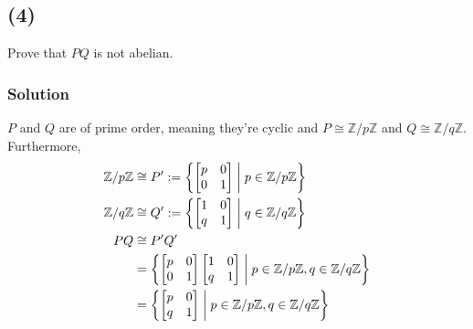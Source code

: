 \documentclass[fleqn]{article}
\begin{document}
        \subsection{(4)}
        Prove that $PQ$ is not abelian.
            
            \subsubsection{Solution}
            $P$ and $Q$ are of prime order, meaning they're cyclic and $P \cong \mathbb{Z}/p\mathbb{Z}$ and $Q \cong \mathbb{Z}/q\mathbb{Z}$.  Furthermore,
            \begin{align}
                \mathbb{Z}/p\mathbb{Z} &\cong P' :=  \left\{\begin{bmatrix}
                    p & 0 \\ 
                    0 & 1
                \end{bmatrix} \thickspace \middle\vert \thickspace p \in \mathbb{Z}/p\mathbb{Z}\right\} \\
                \mathbb{Z}/q\mathbb{Z} &\cong Q' :=  \left\{\begin{bmatrix}
                    1 & 0 \\ 
                    q & 1
                \end{bmatrix} \thickspace \middle\vert \thickspace q \in \mathbb{Z}/q\mathbb{Z}\right\} \\
                PQ &\cong P'Q' \\
                    &= \left\{\begin{bmatrix}
                        p & 0 \\ 
                        0 & 1
                    \end{bmatrix}
                    \begin{bmatrix}
                        1 & 0 \\ 
                        q & 1
                    \end{bmatrix} \thickspace \middle\vert \thickspace p \in \mathbb{Z}/p\mathbb{Z}, q \in \mathbb{Z}/q\mathbb{Z}\right\} \\
                    &= \left\{\begin{bmatrix}
                        p & 0 \\ 
                        q & 1
                    \end{bmatrix} \thickspace \middle\vert \thickspace p \in \mathbb{Z}/p\mathbb{Z}, q \in \mathbb{Z}/q\mathbb{Z}\right\}
            \end{align}
\end{document}

